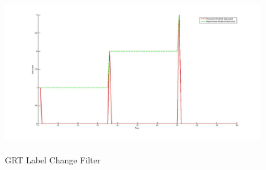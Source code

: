 \begin{figure}
	[h] \centering 
	\includegraphics[height=7cm]{figures/content/grt-label-change-filter.jpg} \caption{GRT Label Change Filter} \label{fg:grt:label:change} 
\end{figure}
